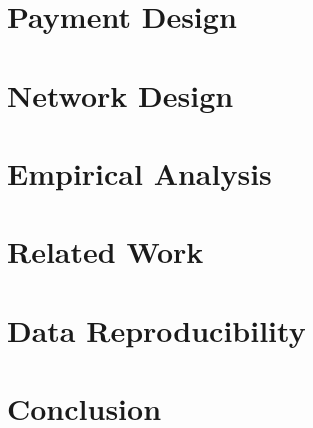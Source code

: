 \documentclass[USenglish,oneside,twocolumn]{article}
\begin{document}
%
%

\section{Payment Design}
\label{sec:payment}


\section{Network Design}
\label{sec:network}


\section{Empirical Analysis}
\label{sec:analysis}


\section{Related Work}
\label{sec:related_work}


%

\section{Data Reproducibility}
\label{sec:code}


\section{Conclusion}
\label{sec:conclusion}






%
\appendix
\end{document}
